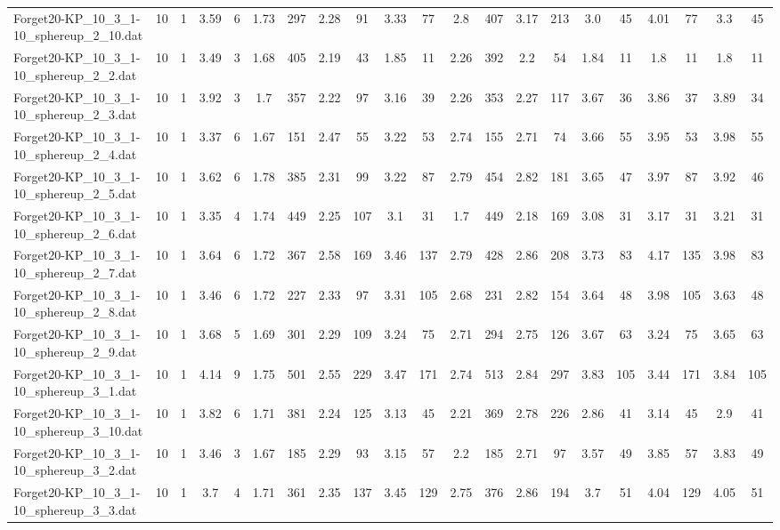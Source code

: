 \begin{sidewaystable}[!ht]
{\begin{tabular}{lcccccccccccccccccccc}
Forget20-KP\_10\_3\_1-10\_sphereup\_2\_10.dat & 10 & 1 & 3.59 & 6 & 1.73 & 297 & 2.28 & 91 & 3.33 & 77 & 2.8 & 407 & 3.17 & 213 & 3.0 & 45 & 4.01 & 77 & 3.3 & 45 \\
Forget20-KP\_10\_3\_1-10\_sphereup\_2\_2.dat & 10 & 1 & 3.49 & 3 & 1.68 & 405 & 2.19 & 43 & 1.85 & 11 & 2.26 & 392 & 2.2 & 54 & 1.84 & 11 & 1.8 & 11 & 1.8 & 11 \\
Forget20-KP\_10\_3\_1-10\_sphereup\_2\_3.dat & 10 & 1 & 3.92 & 3 & 1.7 & 357 & 2.22 & 97 & 3.16 & 39 & 2.26 & 353 & 2.27 & 117 & 3.67 & 36 & 3.86 & 37 & 3.89 & 34 \\
Forget20-KP\_10\_3\_1-10\_sphereup\_2\_4.dat & 10 & 1 & 3.37 & 6 & 1.67 & 151 & 2.47 & 55 & 3.22 & 53 & 2.74 & 155 & 2.71 & 74 & 3.66 & 55 & 3.95 & 53 & 3.98 & 55 \\
Forget20-KP\_10\_3\_1-10\_sphereup\_2\_5.dat & 10 & 1 & 3.62 & 6 & 1.78 & 385 & 2.31 & 99 & 3.22 & 87 & 2.79 & 454 & 2.82 & 181 & 3.65 & 47 & 3.97 & 87 & 3.92 & 46 \\
Forget20-KP\_10\_3\_1-10\_sphereup\_2\_6.dat & 10 & 1 & 3.35 & 4 & 1.74 & 449 & 2.25 & 107 & 3.1 & 31 & 1.7 & 449 & 2.18 & 169 & 3.08 & 31 & 3.17 & 31 & 3.21 & 31 \\
Forget20-KP\_10\_3\_1-10\_sphereup\_2\_7.dat & 10 & 1 & 3.64 & 6 & 1.72 & 367 & 2.58 & 169 & 3.46 & 137 & 2.79 & 428 & 2.86 & 208 & 3.73 & 83 & 4.17 & 135 & 3.98 & 83 \\
Forget20-KP\_10\_3\_1-10\_sphereup\_2\_8.dat & 10 & 1 & 3.46 & 6 & 1.72 & 227 & 2.33 & 97 & 3.31 & 105 & 2.68 & 231 & 2.82 & 154 & 3.64 & 48 & 3.98 & 105 & 3.63 & 48 \\
Forget20-KP\_10\_3\_1-10\_sphereup\_2\_9.dat & 10 & 1 & 3.68 & 5 & 1.69 & 301 & 2.29 & 109 & 3.24 & 75 & 2.71 & 294 & 2.75 & 126 & 3.67 & 63 & 3.24 & 75 & 3.65 & 63 \\
Forget20-KP\_10\_3\_1-10\_sphereup\_3\_1.dat & 10 & 1 & 4.14 & 9 & 1.75 & 501 & 2.55 & 229 & 3.47 & 171 & 2.74 & 513 & 2.84 & 297 & 3.83 & 105 & 3.44 & 171 & 3.84 & 105 \\
Forget20-KP\_10\_3\_1-10\_sphereup\_3\_10.dat & 10 & 1 & 3.82 & 6 & 1.71 & 381 & 2.24 & 125 & 3.13 & 45 & 2.21 & 369 & 2.78 & 226 & 2.86 & 41 & 3.14 & 45 & 2.9 & 41 \\
Forget20-KP\_10\_3\_1-10\_sphereup\_3\_2.dat & 10 & 1 & 3.46 & 3 & 1.67 & 185 & 2.29 & 93 & 3.15 & 57 & 2.2 & 185 & 2.71 & 97 & 3.57 & 49 & 3.85 & 57 & 3.83 & 49 \\
Forget20-KP\_10\_3\_1-10\_sphereup\_3\_3.dat & 10 & 1 & 3.7 & 4 & 1.71 & 361 & 2.35 & 137 & 3.45 & 129 & 2.75 & 376 & 2.86 & 194 & 3.7 & 51 & 4.04 & 129 & 4.05 & 51 \\

\end{tabular}}
\end{sidewaystable}
